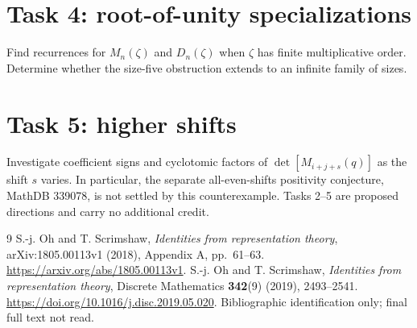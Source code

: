 \documentclass[10pt]{article}
\begin{document}
\section*{Task 4: root-of-unity specializations}
Find recurrences for \(M_n(\zeta)\) and \(D_n(\zeta)\) when \(\zeta\)
has finite multiplicative order. Determine whether the size-five
obstruction extends to an infinite family of sizes.

\section*{Task 5: higher shifts}
Investigate coefficient signs and cyclotomic factors of
\(\det[M_{i+j+s}(q)]\) as the shift \(s\) varies.
In particular, the separate all-even-shifts positivity conjecture,
MathDB 339078, is not settled by this counterexample.
Tasks 2--5 are proposed directions and carry no additional credit.

\begin{thebibliography}{9}
S.-j. Oh and T. Scrimshaw, \emph{Identities from representation theory},
arXiv:1805.00113v1 (2018), Appendix A, pp.~61--63.
\url{https://arxiv.org/abs/1805.00113v1}.
S.-j. Oh and T. Scrimshaw, \emph{Identities from representation theory},
Discrete Mathematics \textbf{342}(9) (2019), 2493--2541.
\url{https://doi.org/10.1016/j.disc.2019.05.020}.
Bibliographic identification only; final full text not read.
\end{thebibliography}
\end{document}
